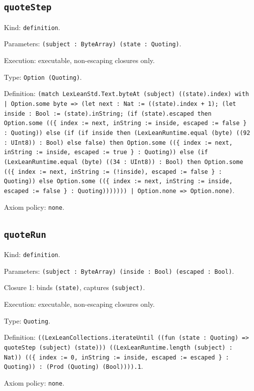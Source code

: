 \documentclass[11pt]{article}
\begin{document}
\subsection*{\texttt{quoteStep}}
\noindent Kind: \texttt{definition}.\par
\noindent Parameters: \texttt{(subject : ByteArray) (state : Quoting)}.\par
\noindent Execution: executable, non-escaping closures only.\par
\noindent Type: \texttt{Option (Quoting)}.\par
\noindent Definition: \texttt{(match LexLeanStd.Text.byteAt (subject) ((state).index) with | Option.some byte => (let next : Nat := ((state).index + 1); (let inside : Bool := (state).inString; (if (state).escaped then Option.some ((\{ index := next, inString := inside, escaped := false \} : Quoting)) else (if (if inside then (LexLeanRuntime.equal (byte) ((92 : UInt8)) : Bool) else false) then Option.some ((\{ index := next, inString := inside, escaped := true \} : Quoting)) else (if (LexLeanRuntime.equal (byte) ((34 : UInt8)) : Bool) then Option.some ((\{ index := next, inString := (!inside), escaped := false \} : Quoting)) else Option.some ((\{ index := next, inString := inside, escaped := false \} : Quoting))))))) | Option.none => Option.none)}.\par
\noindent Axiom policy: \texttt{none}.\par
\subsection*{\texttt{quoteRun}}
\noindent Kind: \texttt{definition}.\par
\noindent Parameters: \texttt{(subject : ByteArray) (inside : Bool) (escaped : Bool)}.\par
\noindent Closure 1: binds \texttt{(state)}, captures \texttt{(subject)}.\par
\noindent Execution: executable, non-escaping closures only.\par
\noindent Type: \texttt{Quoting}.\par
\noindent Definition: \texttt{((LexLeanCollections.iterateUntil ((fun (state : Quoting) => quoteStep (subject) (state))) ((LexLeanRuntime.length (subject) : Nat)) ((\{ index := 0, inString := inside, escaped := escaped \} : Quoting)) : (Prod (Quoting) (Bool)))).1}.\par
\noindent Axiom policy: \texttt{none}.\par
\end{document}
